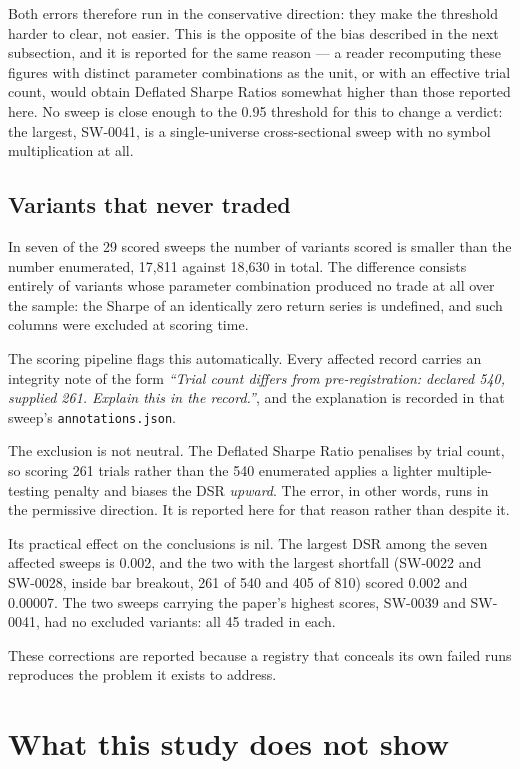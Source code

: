 \documentclass[11pt,a4paper]{article}
\begin{document}
Both errors therefore run in the conservative direction: they make the
threshold harder to clear, not easier. This is the opposite of the bias
described in the next subsection, and it is reported for the same reason ---
a reader recomputing these figures with distinct parameter combinations as the
unit, or with an effective trial count, would obtain Deflated Sharpe Ratios
somewhat higher than those reported here. No sweep is close enough to the 0.95
threshold for this to change a verdict: the largest, SW-0041, is a
single-universe cross-sectional sweep with no symbol multiplication at all.

\subsection{Variants that never traded}

In seven of the 29 scored sweeps the number of variants scored is smaller
than the number enumerated, 17{,}811 against 18{,}630 in total. The difference consists
entirely of variants whose parameter combination produced no trade at all
over the sample: the Sharpe of an identically zero return series is
undefined, and such columns were excluded at scoring time.

The scoring pipeline flags this automatically. Every affected record carries
an integrity note of the form \emph{``Trial count differs from
pre-registration: declared 540, supplied 261. Explain this in the record.''},
and the explanation is recorded in that sweep's \texttt{annotations.json}.

The exclusion is not neutral. The Deflated Sharpe Ratio penalises by trial
count, so scoring 261 trials rather than the 540 enumerated applies a lighter
multiple-testing penalty and biases the DSR \emph{upward}. The error, in other
words, runs in the permissive direction. It is reported here for that reason
rather than despite it.

Its practical effect on the conclusions is nil. The largest DSR among the
seven affected sweeps is 0.002, and the two with the largest shortfall
(SW-0022 and SW-0028, inside bar breakout, 261 of 540 and 405 of 810) scored
0.002 and 0.00007. The two sweeps carrying the paper's highest scores,
SW-0039 and SW-0041, had no excluded variants: all 45 traded in each.

These corrections are reported because a registry that conceals its own
failed runs reproduces the problem it exists to address.

\section{What this study does not show}
\end{document}
